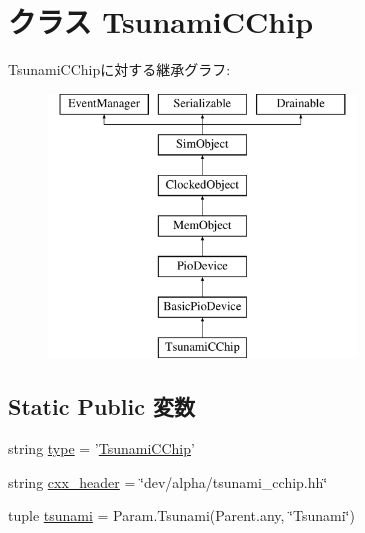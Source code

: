 \hypertarget{classTsunami_1_1TsunamiCChip}{
\section{クラス TsunamiCChip}
\label{classTsunami_1_1TsunamiCChip}
}
TsunamiCChipに対する継承グラフ:\begin{figure}[H]
\begin{center}
\leavevmode
\includegraphics[height=7cm]{classTsunami_1_1TsunamiCChip}
\end{center}
\end{figure}
\subsection*{Static Public 変数}
\begin{DoxyCompactItemize}
\item 
string \hyperlink{classTsunami_1_1TsunamiCChip_acce15679d830831b0bbe8ebc2a60b2ca}{type} = '\hyperlink{classTsunami_1_1TsunamiCChip}{TsunamiCChip}'
\item 
string \hyperlink{classTsunami_1_1TsunamiCChip_a17da7064bc5c518791f0c891eff05fda}{cxx\_\-header} = \char`\"{}dev/alpha/tsunami\_\-cchip.hh\char`\"{}
\item 
tuple \hyperlink{classTsunami_1_1TsunamiCChip_aabfaa1eda1546a625690c7a59b7fed04}{tsunami} = Param.Tsunami(Parent.any, \char`\"{}Tsunami\char`\"{})
\end{DoxyCompactItemize}


